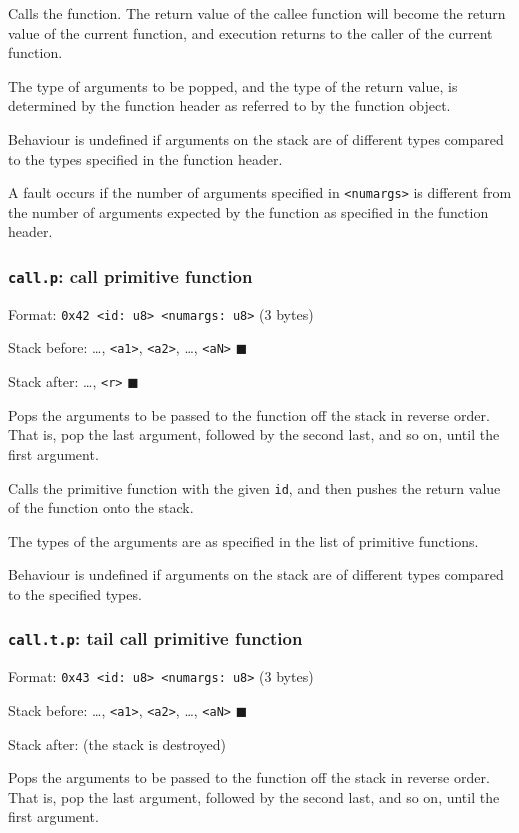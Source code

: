Calls the function. The return value of the callee function will become
the return value of the current function, and execution returns to the
caller of the current function.

The type of arguments to be popped, and the type of the return value, is
determined by the function header as referred to by the function object.

Behaviour is undefined if arguments on the stack are of different types
compared to the types specified in the function header.

A fault occurs if the number of arguments specified in \texttt{<numargs>} is
different from the number of arguments expected by the function as
specified in the function header.

\subsubsection{\texttt{call.p}: call primitive function}
\label{sec:org99bb90f}
Format: \texttt{0x42 <id: u8> <numargs: u8>} (3 bytes)

Stack before: \ldots{}, \texttt{<a1>}, \texttt{<a2>}, \ldots{}, \texttt{<aN>} \(\blacksquare\)

Stack after: \ldots{}, \texttt{<r>} \(\blacksquare\)

Pops the arguments to be passed to the function off the stack in reverse
order. That is, pop the last argument, followed by the second last, and
so on, until the first argument.

Calls the primitive function with the given \texttt{id}, and then pushes the
return value of the function onto the stack.

The types of the arguments are as specified in the list of primitive
functions.

Behaviour is undefined if arguments on the stack are of different types
compared to the specified types.

\subsubsection{\texttt{call.t.p}: tail call primitive function}
\label{sec:orgd22c74d}
Format: \texttt{0x43 <id: u8> <numargs: u8>} (3 bytes)

Stack before: \ldots{}, \texttt{<a1>}, \texttt{<a2>}, \ldots{}, \texttt{<aN>} \(\blacksquare\)

Stack after: (the stack is destroyed)

Pops the arguments to be passed to the function off the stack in reverse
order. That is, pop the last argument, followed by the second last, and
so on, until the first argument.

